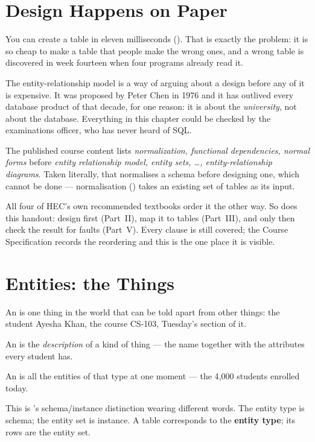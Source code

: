 \section{Design Happens on Paper}

You can create a table in eleven milliseconds (). That is
exactly the problem: it is so cheap to make a table that people make the wrong
ones, and a wrong table is discovered in week fourteen when four programs
already read it.

The entity-relationship model is a way of arguing about a design before any of
it is expensive. It was proposed by Peter Chen in 1976 and it has outlived
every database product of that decade, for one reason: it is about the
\emph{university}, not about the database. Everything in this chapter could be
checked by the examinations officer, who has never heard of SQL.

\begin{alertbox}
The published course content lists \emph{normalization, functional
dependencies, normal forms} before \emph{entity relationship model, entity
sets, \dots, entity-relationship diagrams}. Taken literally, that normalises a
schema before designing one, which cannot be done --- normalisation
() takes an existing set of tables as its input.

\smallskip
All four of HEC's own recommended textbooks order it the other way. So does
this handout: design first (Part~II), map it to tables (Part~III), and only
then check the result for faults (Part~V). Every clause is still covered; the
Course Specification records the reordering and this is the one place it is
visible.
\end{alertbox}

\section{Entities: the Things}

\begin{definitionbox}
An  is one thing in the world that can be told apart from other
things: the student Ayesha Khan, the course CS-103, Tuesday's section of it.

\smallskip
An  is the \emph{description} of a kind of thing --- the
name  together with the attributes every student has.

\smallskip
An  is all the entities of that type at one moment --- the
4{,}000 students enrolled today.

\smallskip
This is 's schema/instance distinction wearing different
words. The entity type is schema; the entity set is instance. A table
corresponds to the \textbf{entity type}; its rows are the entity set.
\end{definitionbox}

